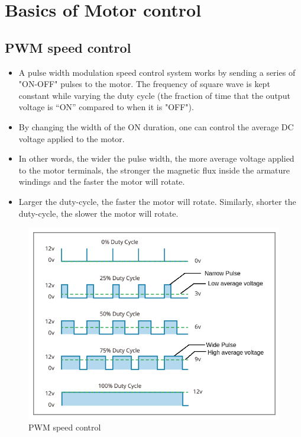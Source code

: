 \chapter{Basics of Motor control} \label{Basics_motor_control}

\section{PWM speed control}
\begin{itemize}
    \item A pulse width modulation speed control system works by sending a series of "ON-OFF" pulses to the motor. The frequency of square wave is kept constant while varying the duty cycle (the fraction of time that the output voltage is “ON” compared to when it is "OFF").
    \item By changing the width of the ON duration, one can control the average DC voltage applied to the motor. 
    \item In other words, the wider the pulse width, the more average voltage applied to the motor terminals, the stronger the magnetic flux inside the armature windings and the faster the motor will rotate.
    \item Larger the duty-cycle, the faster the motor will rotate. Similarly, shorter the duty-cycle, the slower the motor will rotate.
\end{itemize}

\begin{figure}[h!]
\centering
\includegraphics[width=12cm]{./Figures/PWM_speed_control.png}
\caption{PWM speed control}
\label{BLDC_runner}
\end{figure}

